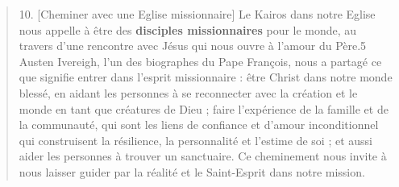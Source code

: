 \begin{quote}
    10. [Cheminer avec une Eglise missionnaire] Le Kairos dans notre Eglise nous appelle à être des \textbf{disciples missionnaires} pour le monde, au travers d’une rencontre avec Jésus qui nous ouvre à l’amour du Père.5 Austen Ivereigh, l’un des biographes du Pape François, nous a partagé ce que signifie entrer dans l’esprit missionnaire : être Christ dans notre monde blessé, en aidant les personnes à se reconnecter avec la création et le monde en tant que créatures de Dieu ; faire l’expérience de la famille et de la communauté, qui sont les liens de confiance et d’amour inconditionnel qui construisent la résilience, la personnalité et l’estime de soi ; et aussi aider les personnes à trouver un sanctuaire. Ce cheminement nous invite à nous laisser guider par la réalité et le Saint-Esprit dans notre mission. 
\end{quote}
